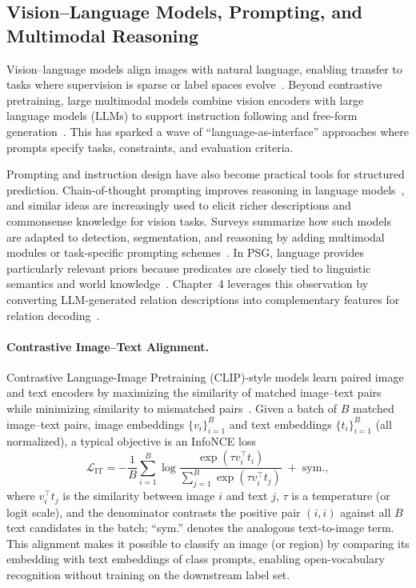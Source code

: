 \subsection{Vision--Language Models, Prompting, and Multimodal Reasoning}
Vision--language models align images with natural language, enabling transfer to tasks where supervision is sparse or label spaces evolve~\citep{radford2021learning, zhang2024vision}. Beyond contrastive pretraining, large multimodal models combine vision encoders with large language models (LLMs) to support instruction following and free-form generation~\citep{li2023blip, zhu2023minigpt, liu2024visual}. This has sparked a wave of ``language-as-interface'' approaches where prompts specify tasks, constraints, and evaluation criteria.

Prompting and instruction design have also become practical tools for structured prediction. Chain-of-thought prompting improves reasoning in language models~\citep{wei2022chain}, and similar ideas are increasingly used to elicit richer descriptions and commonsense knowledge for vision tasks. Surveys summarize how such models are adapted to detection, segmentation, and reasoning by adding multimodal modules or task-specific prompting schemes~\citep{min2023recent, zhang2024vision}. In PSG, language provides particularly relevant priors because predicates are closely tied to linguistic semantics and world knowledge~\citep{radford2021learning, min2023recent, zhang2024vision}. Chapter~4 leverages this observation by converting LLM-generated relation descriptions into complementary features for relation decoding~\citep{zhou2025vlprompt}.

\paragraph{Contrastive Image--Text Alignment.}
Contrastive Language-Image Pretraining (CLIP)-style models learn paired image and text encoders by maximizing the similarity of matched image--text pairs while minimizing similarity to mismatched pairs~\citep{radford2021learning}. Given a batch of $B$ matched image--text pairs, image embeddings $\{v_i\}_{i=1}^{B}$ and text embeddings $\{t_i\}_{i=1}^{B}$ (all normalized), a typical objective is an InfoNCE loss~\citep{oord2018cpc}
\begin{equation}
\mathcal{L}_{\mathrm{IT}} = -\frac{1}{B}\sum_{i=1}^{B}\log\frac{\exp(\tau v_i^\top t_i)}{\sum_{j=1}^{B}\exp(\tau v_i^\top t_j)} \;+\; \text{sym.},
\end{equation}
where $v_i^\top t_j$ is the similarity between image $i$ and text $j$, $\tau$ is a temperature (or logit scale), and the denominator contrasts the positive pair $(i,i)$ against all $B$ text candidates in the batch; ``sym.'' denotes the analogous text-to-image term. This alignment makes it possible to classify an image (or region) by comparing its embedding with text embeddings of class prompts, enabling open-vocabulary recognition without training on the downstream label set.

